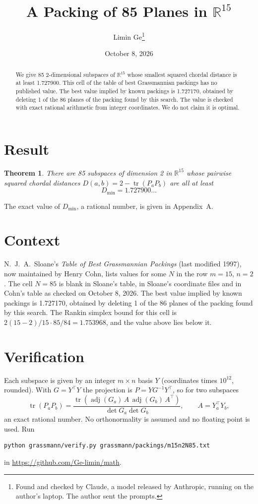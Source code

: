 \documentclass[11pt,a4paper]{article}
\title{A Packing of 85 Planes in $\mathbb{R}^{15}$}
\author{Limin Ge\thanks{Found and checked by Claude, a model released by Anthropic, running on the author's laptop. The author sent the prompts.}}
\date{October 8, 2026}
\newtheorem*{theorem}{Theorem}
\begin{document}
\maketitle
\begin{abstract}
We give 85 2-dimensional subspaces of $\mathbb{R}^{15}$ whose smallest squared chordal distance is at least 1.727900. This cell of the table of best Grassmannian packings has no published value. The best value implied by known packings is 1.727170, obtained by deleting 1 of the 86 planes of the packing found by this search. The value is checked with exact rational arithmetic from integer coordinates. We do not claim it is optimal.
\end{abstract}

\section{Result}
\begin{theorem}
There are 85 subspaces of dimension 2 in $\mathbb{R}^{15}$ whose pairwise squared chordal distances $D(a,b) = 2 - \operatorname{tr}(P_aP_b)$ are all at least
\[ D_{\min} = 1.727900\ldots \]
\end{theorem}
The exact value of $D_{\min}$, a rational number, is given in Appendix~A.


\section{Context}
N.~J.~A.~Sloane's \emph{Table of Best Grassmannian Packings} (last modified 1997), now maintained by Henry Cohn, lists values for some $N$ in the row $m=15$, $n=2$. The cell $N=85$ is blank in Sloane's table, in Sloane's coordinate files and in Cohn's table as checked on October 8, 2026. The best value implied by known packings is 1.727170, obtained by deleting 1 of the 86 planes of the packing found by this search. The Rankin simplex bound for this cell is $2(15-2)/15\cdot 85/84 = 1.753968$, and the value above lies below it.


\section{Verification}
Each subspace is given by an integer $m\times n$ basis $Y$ (coordinates times $10^{12}$, rounded). With $G=Y^\top Y$ the projection is $P=YG^{-1}Y^\top$, so for two subspaces
\[ \operatorname{tr}(P_aP_b)=\frac{\operatorname{tr}(\operatorname{adj}(G_a)\,A\,\operatorname{adj}(G_b)\,A^\top)}{\det G_a\det G_b},\qquad A=Y_a^\top Y_b, \]
an exact rational number. No orthonormality is assumed and no floating point is used. Run
\begin{verbatim}
python grassmann/verify.py grassmann/packings/m15n2N85.txt
\end{verbatim}
in \url{https://github.com/Ge-limin/math}.
\end{document}
